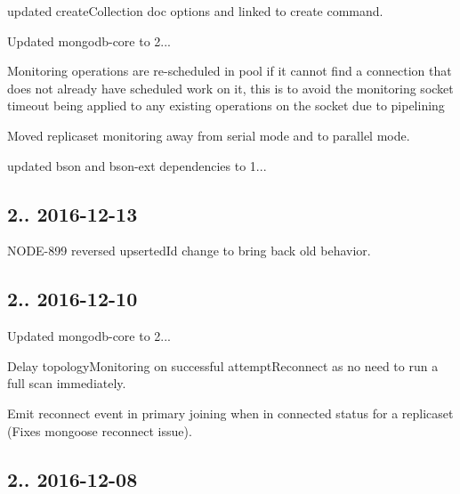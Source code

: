 \begin{DoxyItemize}
\item updated create\+Collection doc options and linked to create command.
\item Updated mongodb-\/core to 2...
\begin{DoxyItemize}
\item Monitoring operations are re-\/scheduled in pool if it cannot find a connection that does not already have scheduled work on it, this is to avoid the monitoring socket timeout being applied to any existing operations on the socket due to pipelining
\item Moved replicaset monitoring away from serial mode and to parallel mode.
\item updated bson and bson-\/ext dependencies to 1...
\end{DoxyItemize}
\end{DoxyItemize}

\subsection*{2.. 2016-\/12-\/13 }


\begin{DoxyItemize}
\item N\+O\+D\+E-\/899 reversed upserted\+Id change to bring back old behavior.
\end{DoxyItemize}

\subsection*{2.. 2016-\/12-\/10 }


\begin{DoxyItemize}
\item Updated mongodb-\/core to 2...
\begin{DoxyItemize}
\item Delay topology\+Monitoring on successful attempt\+Reconnect as no need to run a full scan immediately.
\item Emit reconnect event in primary joining when in connected status for a replicaset (Fixes mongoose reconnect issue).
\end{DoxyItemize}
\end{DoxyItemize}

\subsection*{2.. 2016-\/12-\/08 }


